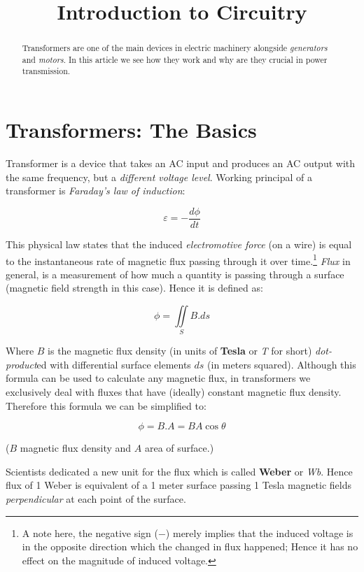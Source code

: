 \documentclass{article}
\begin{document}
	
	\title{Introduction to Circuitry}
	\author{}
	
	\maketitle
	
	\begin{abstract}
	Transformers are one of the main devices in electric machinery alongside \textit{generators} and \textit{motors}.
	In this article we see how they work and why are they crucial in power transmission.
	\end{abstract}
	
	\section{Transformers: The Basics}
	Transformer is a device that takes an AC input and produces an AC output with the same frequency, but a \textit{different voltage level}.
	Working principal of a transformer is \textit{Faraday's law of induction}:

	$$ \varepsilon = - \frac{d \phi}{dt} $$

	This physical law states that the induced \textit{electromotive force} (on a wire) is equal to the instantaneous rate of magnetic flux passing through it over time.\footnote[1]{A note here, the negative sign ($-$) merely implies that the induced voltage is in the opposite direction which the changed in flux happened; Hence it has no effect on the magnitude of induced voltage.}
	\textit{Flux} in general, is a measurement of how much a quantity is passing through a surface (magnetic field strength in this case).
	Hence it is defined as:
	
	$$ \phi = \iint\limits_S B.ds$$
	
	Where $B$ is the magnetic flux density (in units of \textbf{Tesla} or \textit{T} for short) \textit{dot-product}ed with differential surface elements $ds$ (in meters squared).
	Although this formula can be used to calculate any magnetic flux, in transformers we exclusively deal with fluxes that have (ideally) constant magnetic flux density.
	Therefore this formula we can be simplified to:
	
	$$ \phi = B.A = BA\cos \theta$$
	
	($B$ magnetic flux density and $A$ area of surface.)
	
	Scientists dedicated a new unit for the flux which is called \textbf{Weber} or \textit{Wb}.
	Hence flux of 1 Weber is equivalent of a 1 meter surface passing 1 Tesla magnetic fields \textit{perpendicular} at each point of the surface.
	
\end{document}
